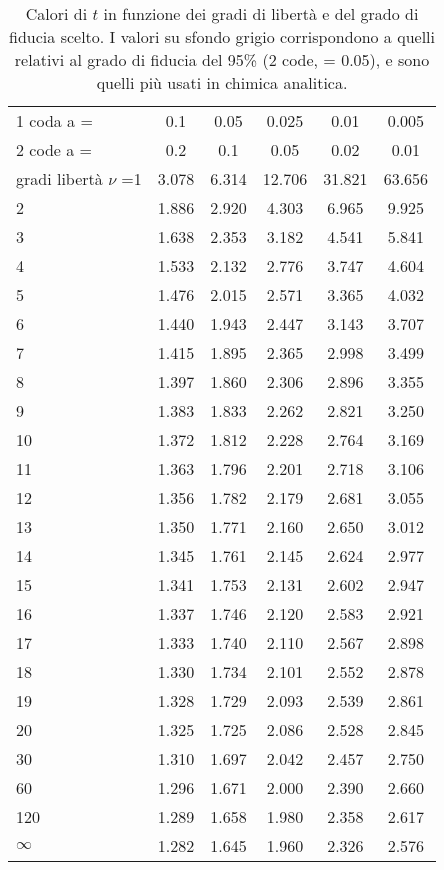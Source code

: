 \begin{table}
\begin{tabular}{lccccc}
1 coda a = & 0.1 & 0.05 & 0.025 & 0.01 & 0.005\\
2 code a = & 0.2 & 0.1 & 0.05 & 0.02 & 0.01\\
gradi libertà $\nu$ =1 & 3.078 & 6.314 & 12.706 & 31.821 & 63.656\\
2 & 1.886 & 2.920 & 4.303 & 6.965 & 9.925 \\
3 & 1.638 & 2.353 & 3.182 & 4.541 & 5.841 \\
4 & 1.533 & 2.132 & 2.776 & 3.747 & 4.604 \\
5 & 1.476 & 2.015 & 2.571 & 3.365 & 4.032 \\
6 & 1.440 & 1.943 & 2.447 & 3.143 & 3.707 \\
7 & 1.415 & 1.895 & 2.365 & 2.998 & 3.499 \\
8 & 1.397 & 1.860 & 2.306 & 2.896 & 3.355 \\
9 & 1.383 & 1.833 & 2.262 & 2.821 & 3.250 \\
10 & 1.372 & 1.812 & 2.228 & 2.764 & 3.169 \\
11 & 1.363 & 1.796 & 2.201 & 2.718 & 3.106 \\
12 & 1.356 & 1.782 & 2.179 & 2.681 & 3.055 \\
13 & 1.350 & 1.771 & 2.160 & 2.650 & 3.012 \\
14 & 1.345 & 1.761 & 2.145 & 2.624 & 2.977 \\
15 & 1.341 & 1.753 & 2.131 & 2.602 & 2.947 \\
16 & 1.337 & 1.746 & 2.120 & 2.583 & 2.921 \\
17 & 1.333 & 1.740 & 2.110 & 2.567 & 2.898 \\
18 & 1.330 & 1.734 & 2.101 & 2.552 & 2.878 \\
19 & 1.328 & 1.729 & 2.093 & 2.539 & 2.861 \\
20 & 1.325 & 1.725 & 2.086 & 2.528 & 2.845 \\
30 & 1.310 & 1.697 & 2.042 & 2.457 & 2.750 \\
60 & 1.296 & 1.671 & 2.000 & 2.390 & 2.660 \\
120 & 1.289 & 1.658 & 1.980 & 2.358 & 2.617 \\
$\infty$ & 1.282 & 1.645 & 1.960 & 2.326 & 2.576 \\
\end{tabular}
\caption{Calori di $t$ in funzione dei gradi di libertà e del grado di fiducia scelto. I valori su sfondo grigio corrispondono a quelli relativi al grado di fiducia del 95\% (2 code, \alpha = 0.05), e sono quelli più usati in chimica analitica.}
\label{tab:statistica:1}
\end{table}

